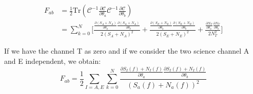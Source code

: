 \documentclass[a4paper,12pt]{article}
\begin{document}
\begin{equation} 
\begin{split}
     F_{ab} & =   \frac{1}{2} \mathrm{Tr}\left(\mathcal{C}^{-1}\frac{\partial \mathcal{C}} {\partial \theta_a} \mathcal{C}^{-1} \frac{\partial \mathcal{C}}{\partial\theta_b}  \right)  \\ 
     &=  \sum_{k=0}^{N} \Bigg[\frac{\frac{\partial (S_A+N_A)} {\partial \theta_a}\frac{\partial (S_A+N_A)} {\partial \theta_b}}{2(S_A+N_A)^2} + \frac{\frac{\partial (S_E+N_E)} {\partial \theta_a}\frac{\partial (S_E+N_E)} {\partial \theta_b}}{2(S_E+N_E)^2} + \frac{\frac{\partial N_T} {\partial \theta_a}\frac{\partial N_T} {\partial \theta_b}}{2N_T^2}\Bigg]
\end{split}
\end{equation}

If we have the channel T as zero and if we consider the two science channel A and E independent, we obtain:
\begin{equation}
    F_{ab} =  \frac{1}{2} \sum_{I=A,E} \sum_{k=0}^N \frac{\frac{\partial S_I(f)+ N_I(f)} {\partial \theta_a}\frac{\partial S_I(f)+ N_I(f)} {\partial \theta_b}}{\left(S_a(f)+ N_a(f)\right)^2} 
\end{equation}
\end{document}
